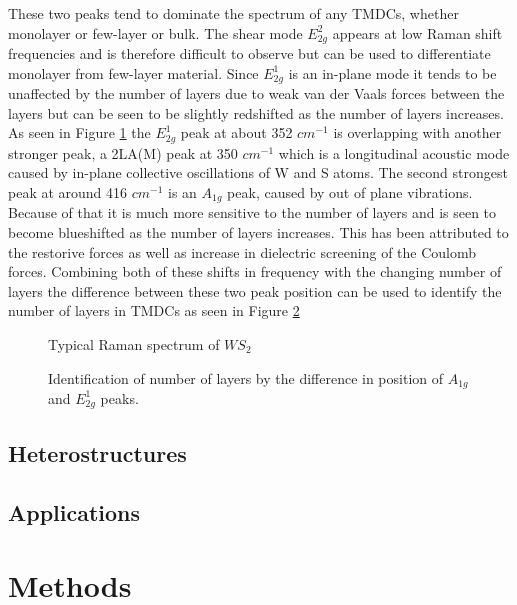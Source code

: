 \documentclass[12pt]{article}
\begin{document}
	These two peaks tend to dominate the spectrum of any TMDCs, whether monolayer or few-layer or bulk. The shear mode $E^2_{2g}$ appears at low Raman shift frequencies and is therefore difficult to observe but can be used to differentiate monolayer from few-layer material. Since $E^1_{2g}$ is an in-plane mode it tends to be unaffected by the number of layers due to weak van der Vaals forces between the layers but can be seen to be slightly redshifted as the number of layers increases. As seen in Figure \ref{fig:TypicalRamanSpectrumWS2} the $E^1_{2g}$ peak at about 352 $cm^{-1}$ is overlapping with another stronger peak, a 2LA(M) peak at 350 $cm^{-1}$ which is a longitudinal acoustic mode caused by in-plane collective oscillations of W and S atoms. The second strongest peak at around 416 $cm^{-1}$ is an $A_{1g}$ peak, caused by out of plane vibrations. Because of that it is much more sensitive to the number of layers and is seen to become blueshifted as the number of layers increases. This has been attributed to the restorive forces as well as increase in dielectric screening of the Coulomb forces. Combining both of these shifts in frequency with the changing number of layers the difference between these two peak position can be used to identify the number of layers in TMDCs as seen in Figure \ref{fig:LayerNumberIdentificationRamanShiftWS2}
	
	\begin{figure}[h]
	\begin{center}
	\caption{Typical Raman spectrum of $WS_2$}
	\label{fig:TypicalRamanSpectrumWS2}
	\end{center}
	\end{figure}
	
	\begin{figure}
	\begin{center}
	\caption{Identification of number of layers by the difference in position of $A_{1g}$ and $E^1_{2g}$ peaks.}
	\label{fig:LayerNumberIdentificationRamanShiftWS2}
	\end{center}
	\end{figure}
	
	\subsection{Heterostructures}
	\subsection{Applications}
\section{Methods}
\end{document}

